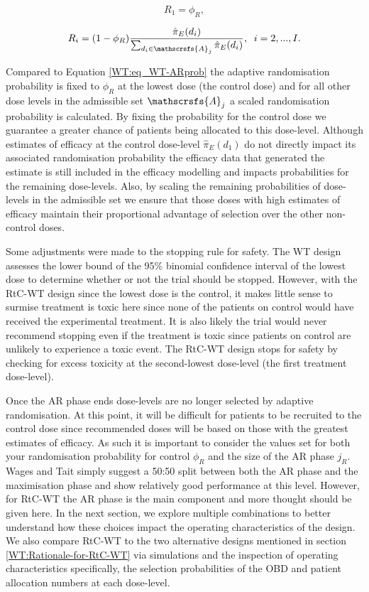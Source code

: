 \begin{equation}
	R_1 = \phi_R,
\end{equation}

\begin{equation}
	R_i = (1-\phi_R)\frac{\hat{\pi}_E(d_i)}{\sum_{d_i \in \mathscrsfs{A}_j}\hat{\pi}_E(d_i)}, \; \; i=2,...,I. 
\end{equation}

Compared to Equation \ref{WT:eq_WT-ARprob} the adaptive randomisation probability is fixed to $\phi_R$ at the lowest dose (the control dose) and for all other dose levels in the admissible set $\mathscrsfs{A}_j$ a scaled randomisation probability is calculated. By fixing the probability for the control dose we guarantee a greater chance of patients being allocated to this dose-level. Although estimates of efficacy at the control dose-level $\hat{\pi}_E(d_1)$ do not directly impact its associated randomisation probability the efficacy data that generated the estimate is still included in the efficacy modelling and impacts probabilities for the remaining dose-levels. Also, by scaling the remaining probabilities of dose-levels in the admissible set we ensure that those doses with high estimates of efficacy maintain their proportional advantage of selection over the other non-control doses.

Some adjustments were made to the stopping rule for safety. The WT design assesses the lower bound of the 95\% binomial confidence interval of the lowest dose to determine whether or not the trial should be stopped. However, with the RtC-WT design since the lowest dose is the control, it makes little sense to surmise treatment is toxic here since none of the patients on control would have received the experimental treatment. It is also likely the trial would never recommend stopping even if the treatment is toxic since patients on control are unlikely to experience a toxic event. The RtC-WT design stops for safety by checking for excess toxicity at the second-lowest dose-level (the first treatment dose-level). 

Once the AR phase ends dose-levels are no longer selected by adaptive randomisation. At this point, it will be difficult for patients to be recruited to the control dose since recommended doses will be based on those with the greatest estimates of efficacy. As such it is important to consider the values set for both your randomisation probability for control $\phi_R$ and the size of the AR phase $j_R$. Wages and Tait simply suggest a 50:50 split between both the AR phase and the maximisation phase and show relatively good performance at this level. However, for RtC-WT the AR phase is the main component and more thought should be given here. In the next section, we explore multiple combinations to better understand how these choices impact the operating characteristics of the design. We also compare RtC-WT to the two alternative designs mentioned in section  \ref{WT:Rationale-for-RtC-WT} via simulations and the inspection of operating characteristics specifically, the selection probabilities of the OBD and patient allocation numbers at each dose-level. 

